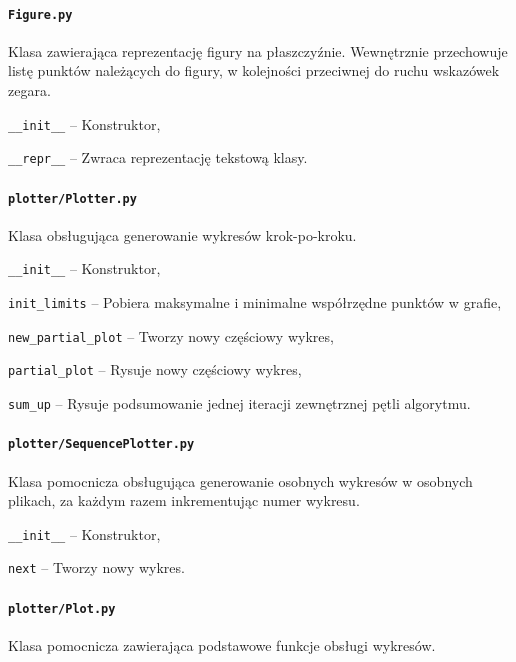 \documentclass[12pt]{article}
\let\tempone\itemize
\let\temptwo\enditemize
\renewenvironment{itemize}{\tempone\setlength{\itemsep}{0cm}}{\temptwo}
\begin{document}
	\paragraph{\lstinline|Figure.py|}
		Klasa zawierająca reprezentację figury na płaszczyźnie. Wewnętrznie przechowuje listę punktów należących do figury, w kolejności przeciwnej do ruchu wskazówek zegara.
		\begin{itemize}
			\item \lstinline|__init__| -- Konstruktor,
			\item \lstinline|__repr__| -- Zwraca reprezentację tekstową klasy.
		\end{itemize}
	
	\paragraph{\lstinline|plotter/Plotter.py|}
		Klasa obsługująca generowanie wykresów krok-po-kroku.
		\begin{itemize}
			\item \lstinline|__init__| -- Konstruktor,
			\item \lstinline|init_limits| -- Pobiera maksymalne i minimalne współrzędne punktów w grafie,
			\item \lstinline|new_partial_plot| -- Tworzy nowy częściowy wykres,
			\item \lstinline|partial_plot| -- Rysuje nowy częściowy wykres,
			\item \lstinline|sum_up| -- Rysuje podsumowanie jednej iteracji zewnętrznej pętli algorytmu.
		\end{itemize}
	
	\paragraph{\lstinline|plotter/SequencePlotter.py|}
		Klasa pomocnicza obsługująca generowanie osobnych wykresów w osobnych plikach, za każdym razem inkrementując numer wykresu.
		\begin{itemize}
			\item \lstinline|__init__| -- Konstruktor,
			\item \lstinline|next| -- Tworzy nowy wykres.
		\end{itemize}
	
	\paragraph{\lstinline|plotter/Plot.py|}
		Klasa pomocnicza zawierająca podstawowe funkcje obsługi wykresów.
	
\end{document}

